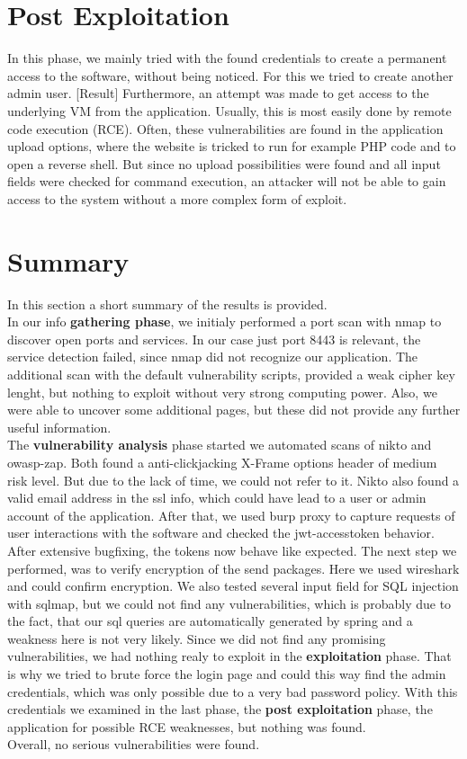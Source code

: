 \documentclass{scrreprt}
\begin{document}
\pagebreak
\section{Post Exploitation}
In this phase, we mainly tried with the found credentials to create a permanent access to the software, without being noticed. For this we tried to create another admin user. [Result]
Furthermore, an attempt was made to get access to the underlying VM from the application. Usually, this is most easily done by remote code execution (RCE). Often, these vulnerabilities are found in the application upload options, where the website is tricked to run for example PHP code and to open a reverse shell. But since no upload possibilities were found and all input fields were checked for command execution, an attacker will not be able to gain access to the system without a more complex form of exploit.

\section{Summary}
In this section a short summary of the results is provided. \\

\noindent In our info \textbf{gathering phase}, we initialy performed a port scan with nmap to discover open ports and services. In our case just port 8443 is relevant, the service detection failed, since nmap did not recognize our application. The additional scan with the default vulnerability scripts, provided a weak cipher key lenght, but nothing to exploit without very strong computing power. 
Also, we were able to uncover some additional pages, but these did not provide any further useful information. \\
The \textbf{vulnerability analysis} phase started we automated scans of nikto and owasp-zap. Both found a anti-clickjacking X-Frame options header of medium risk level. But due to the lack of time, we could not refer to it. Nikto also found a valid email address in the ssl info, which could have lead to a user or admin account of the application. After that, we used burp proxy to capture requests of user interactions with the software and checked the jwt-accesstoken behavior. After extensive bugfixing, the tokens now behave like expected. The next step we performed, was to verify encryption of the send packages. Here we used wireshark and could confirm encryption. We also tested several input field for SQL injection with sqlmap, but we could not find any vulnerabilities, which is probably due to the fact, that our sql queries are automatically generated by spring and a weakness here is not very likely.
Since we did not find any promising vulnerabilities, we had nothing realy to exploit in the \textbf{exploitation} phase. That is why we tried to brute force the login page and could this way find the admin credentials, which was only possible due to a very bad password policy. With this credentials we examined in the last phase, the \textbf{post exploitation} phase, the application for possible RCE weaknesses, but nothing was found. \\
Overall, no serious vulnerabilities were found.   
\end{document}
